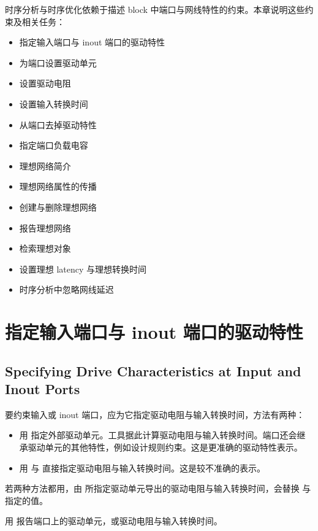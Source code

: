 \label{chap:ports}

时序分析与时序优化依赖于描述 block 中端口与网线特性的约束。本章说明这些约束及相关任务：
\begin{itemize}
  \item 指定输入端口与 inout 端口的驱动特性
  \item 为端口设置驱动单元
  \item 设置驱动电阻
  \item 设置输入转换时间
  \item 从端口去掉驱动特性
  \item 指定端口负载电容
  \item 理想网络简介
  \item 理想网络属性的传播
  \item 创建与删除理想网络
  \item 报告理想网络
  \item 检索理想对象
  \item 设置理想 latency 与理想转换时间
  \item 时序分析中忽略网线延迟
\end{itemize}

\section{指定输入端口与 inout 端口的驱动特性}
\subsection*{Specifying Drive Characteristics at Input and Inout Ports}

要约束输入或 inout 端口，应为它指定驱动电阻与输入转换时间，方法有两种：
\begin{itemize}
  \item 用  指定外部驱动单元。工具据此计算驱动电阻与输入转换时间。端口还会继承驱动单元的其他特性，例如设计规则约束。这是更准确的驱动特性表示。
  \item 用  与  直接指定驱动电阻与输入转换时间。这是较不准确的表示。
\end{itemize}

若两种方法都用，由  所指定驱动单元导出的驱动电阻与输入转换时间，会替换  与  指定的值。

用  报告端口上的驱动单元，或驱动电阻与输入转换时间。

